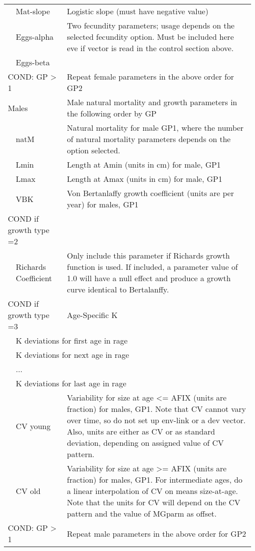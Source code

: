 \begin{center}
\begin{longtable}{p{1cm} p{2.5cm} p{10cm}}
		& Mat-slope & Logistic slope (must have negative value) \\
		& Eggs-alpha & Two fecundity parameters; usage depends on the selected fecundity option.  Must be included here eve if vector is read in the control section above.\\
		& Eggs-beta & \\
		\hline
		\multicolumn{2}{l}{COND: GP > 1} & Repeat female parameters in the above order for GP2\\
		\hline
		\multicolumn{2}{l}{Males} & Male natural mortality and growth parameters in the following order by GP\\
		& natM & Natural mortality for male GP1, where the number of natural mortality parameters depends on the option selected.\\
		& Lmin & Length at Amin (units in cm) for male, GP1\\
		& Lmax & Length at Amax (units in cm) for male, GP1\ \\
		& VBK &  Von Bertanlaffy growth coefficient (units are per year) for males, GP1\\
		\hline
		\multicolumn{2}{l}{COND if growth type =2 } & \\
		& Richards Coefficient & Only include this parameter if Richards growth function is used.  If included, a parameter value of 1.0 will have a null effect and produce a growth curve identical to Bertalanffy.\\
		\multicolumn{2}{l}{COND if growth type =3 } & Age-Specific K \\
		& \multicolumn{2}{l}{K deviations for first age in rage}\\
		& \multicolumn{2}{l}{K deviations for next age in rage}\\
		& ... & \\
		& \multicolumn{2}{l}{K deviations for last age in rage}\\
		\hline
		& CV young & Variability for size at age <= AFIX (units are fraction) for males, GP1.  Note that CV cannot vary over time, so do not set up env-link or a dev vector.  Also, units are either as CV or as standard deviation, depending on assigned value of CV pattern.\\
		& CV old &  Variability for size at age >= AFIX (units are fraction) for males, GP1. For intermediate ages, do a linear interpolation of CV on means size-at-age.  Note that the units for CV will depend on the CV pattern and the value of MGparm as offset.\\
		\multicolumn{2}{l}{COND: GP > 1} & Repeat male parameters in the above order for GP2\\

\end{longtable}
\end{center}
